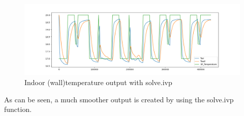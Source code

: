 \begin{figure}[ht]
	\centering
	\includegraphics[width=1\columnwidth]{pictures/solve_ivp_without_for_loop.png}
	\caption[Short title]{Indoor (wall)temperature output with solve.ivp}
	\label{fig:profilelabels}
\end{figure}

As can be seen, a much smoother output is created by using the solve.ivp function.

	


